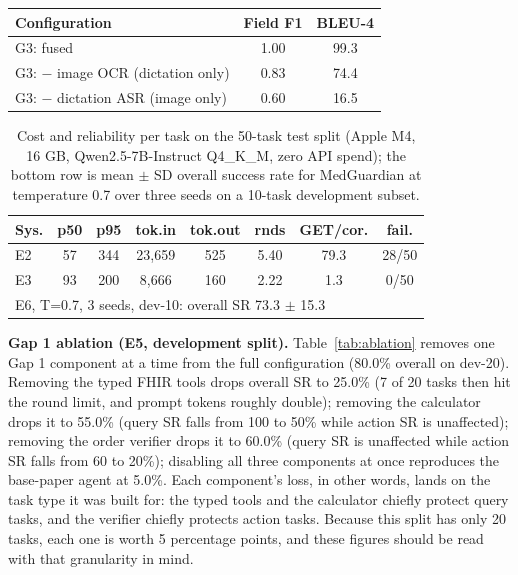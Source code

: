 \documentclass[conference]{IEEEtran}
\begin{document}
\begin{table}[t]
\vspace{4pt}
\begin{tabular}{lcc}
\toprule
\textbf{Configuration} & \textbf{Field F1} & \textbf{BLEU-4} \\
\midrule
G3: fused & 1.00 & 99.3 \\
G3: $-$ image OCR (dictation only) & 0.83 & 74.4 \\
G3: $-$ dictation ASR (image only) & 0.60 & 16.5 \\
\bottomrule
\end{tabular}
\end{table}

\begin{table}[t]
\centering
\small
\caption{Cost and reliability per task on the 50-task test split (Apple M4, 16 GB, Qwen2.5-7B-Instruct Q4\_K\_M, zero API spend); the bottom row is mean $\pm$ SD overall success rate for MedGuardian at temperature 0.7 over three seeds on a 10-task development subset.}
\label{tab:efficiency}
\setlength{\tabcolsep}{3.5pt}
\begin{tabular}{lccccccc}
\toprule
\textbf{Sys.} & \textbf{p50} & \textbf{p95} & \textbf{tok.in} & \textbf{tok.out} & \textbf{rnds} & \textbf{GET/cor.} & \textbf{fail.} \\
\midrule
E2 & 57 & 344 & 23,659 & 525 & 5.40 & 79.3 & 28/50 \\
E3 & 93 & 200 & 8,666 & 160 & 2.22 & 1.3 & 0/50 \\
\bottomrule
\multicolumn{8}{l}{E6, T=0.7, 3 seeds, dev-10: overall SR 73.3 $\pm$ 15.3} \\
\end{tabular}
\end{table}

\textbf{Gap 1 ablation (E5, development split).} Table~\ref{tab:ablation} removes one Gap 1 component at a time from the full configuration (80.0\% overall on dev-20). Removing the typed FHIR tools drops overall SR to 25.0\% (7 of 20 tasks then hit the round limit, and prompt tokens roughly double); removing the calculator drops it to 55.0\% (query SR falls from 100 to 50\% while action SR is unaffected); removing the order verifier drops it to 60.0\% (query SR is unaffected while action SR falls from 60 to 20\%); disabling all three components at once reproduces the base-paper agent at 5.0\%. Each component's loss, in other words, lands on the task type it was built for: the typed tools and the calculator chiefly protect query tasks, and the verifier chiefly protects action tasks. Because this split has only 20 tasks, each one is worth 5 percentage points, and these figures should be read with that granularity in mind.
\end{document}
